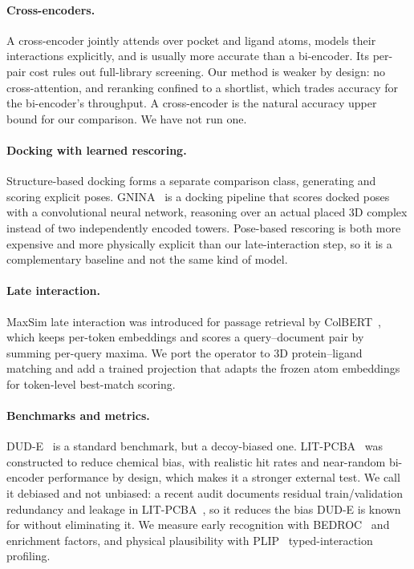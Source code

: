\documentclass[10pt,letterpaper,twocolumn]{article}
\begin{document}
\paragraph{Cross-encoders.} A cross-encoder jointly attends over pocket and ligand atoms, models their interactions explicitly, and is usually more accurate than a bi-encoder. Its per-pair cost rules out full-library screening. Our method is weaker by design: no cross-attention, and reranking confined to a shortlist, which trades accuracy for the bi-encoder's throughput. A cross-encoder is the natural accuracy upper bound for our comparison. We have not run one.

\paragraph{Docking with learned rescoring.} Structure-based docking forms a separate comparison class, generating and scoring explicit poses. GNINA~\cite{gnina} is a docking pipeline that scores docked poses with a convolutional neural network, reasoning over an actual placed 3D complex instead of two independently encoded towers. Pose-based rescoring is both more expensive and more physically explicit than our late-interaction step, so it is a complementary baseline and not the same kind of model.

\paragraph{Late interaction.} MaxSim late interaction was introduced for passage retrieval by ColBERT~\cite{colbert,colbertv2}, which keeps per-token embeddings and scores a query--document pair by summing per-query maxima. We port the operator to 3D protein--ligand matching and add a trained projection that adapts the frozen atom embeddings for token-level best-match scoring.

\paragraph{Benchmarks and metrics.} DUD-E~\cite{dude} is a standard benchmark, but a decoy-biased one. LIT-PCBA~\cite{litpcba} was constructed to reduce chemical bias, with realistic hit rates and near-random bi-encoder performance by design, which makes it a stronger external test. We call it debiased and not unbiased: a recent audit documents residual train/validation redundancy and leakage in LIT-PCBA~\cite{litpcbaaudit}, so it reduces the bias DUD-E is known for without eliminating it. We measure early recognition with BEDROC~\cite{bedroc} and enrichment factors, and physical plausibility with PLIP~\cite{plip} typed-interaction profiling.
\end{document}
